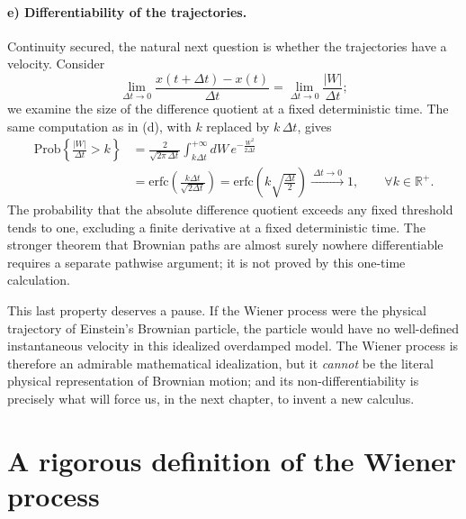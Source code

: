 \paragraph{e) Differentiability of the trajectories.}
Continuity secured, the natural next question is whether the trajectories have a velocity.
Consider
\begin{equation}
\lim_{\Delta t\to0}\frac{x(t+\Delta t)-x(t)}{\Delta t} = \lim_{\Delta t\to0}\frac{|W|}{\Delta t};
\end{equation}
we examine the size of the difference quotient at a fixed deterministic time.
The same computation as in (d), with $k$ replaced by $k\,\Delta t$, gives
\begin{equation}\begin{split}
\mathrm{Prob}\left\{\frac{|W|}{\Delta t}>k\right\} &= \frac{2}{\sqrt{2\pi\,\Delta t}}\int_{k\Delta t}^{+\infty} dW\, e^{-\frac{W^2}{2\Delta t}}\\
&= \mathrm{erfc}\!\left(\frac{k\Delta t}{\sqrt{2\Delta t}}\right) = \mathrm{erfc}\!\left(k\sqrt{\tfrac{\Delta t}{2}}\right) \xrightarrow{\ \Delta t\to0\ } 1,
\qquad \forall k\in\mathbb{R}^+.
\end{split}\end{equation}
The probability that the absolute difference quotient exceeds any fixed threshold tends to one, excluding a finite derivative at a fixed deterministic time.
The stronger theorem that Brownian paths are almost surely nowhere differentiable requires a separate pathwise argument; it is not proved by this one-time calculation.

This last property deserves a pause.
If the Wiener process were the physical trajectory of Einstein's Brownian particle, the particle would have no well-defined instantaneous velocity in this idealized overdamped model.
The Wiener process is therefore an admirable mathematical idealization, but it \emph{cannot} be the literal physical representation of Brownian motion; and its non-differentiability is precisely what will force us, in the next chapter, to invent a new calculus.


\section{A rigorous definition of the Wiener process}

